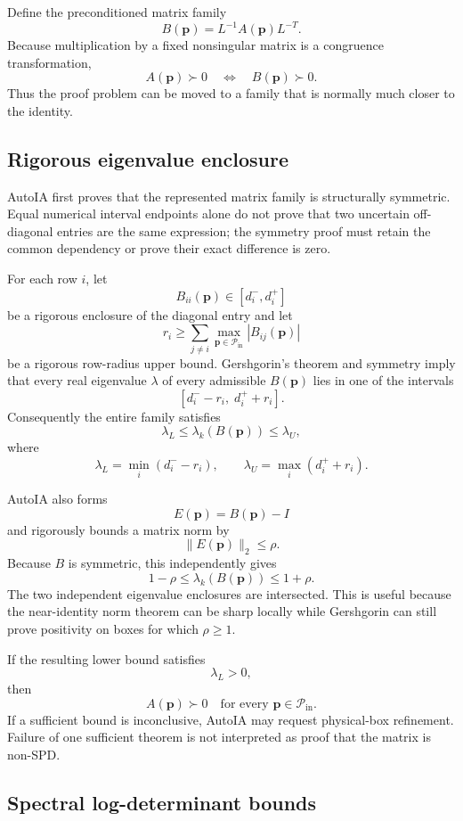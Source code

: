 \documentclass[11pt]{article}
\newcommand{\Pin}{\mathcal{P}_{\mathrm{in}}}
\newcommand{\pv}{\mathbf{p}}
\begin{document}
Define the preconditioned matrix family
\[
  B(\pv)=L^{-1}A(\pv)L^{-T}.
\]
Because multiplication by a fixed nonsingular matrix is a congruence
transformation,
\[
  A(\pv)\succ0
  \quad\Longleftrightarrow\quad
  B(\pv)\succ0.
\]
Thus the proof problem can be moved to a family that is normally much closer to
the identity.

\subsection{Rigorous eigenvalue enclosure}

AutoIA first proves that the represented matrix family is structurally
symmetric.  Equal numerical interval endpoints alone do not prove that two
uncertain off-diagonal entries are the same expression; the symmetry proof must
retain the common dependency or prove their exact difference is zero.

For each row \(i\), let
\[
  B_{ii}(\pv)\in[d_i^-,d_i^+]
\]
be a rigorous enclosure of the diagonal entry and let
\[
  r_i
  \ge
  \sum_{j\ne i}\max_{\pv\in\Pin}|B_{ij}(\pv)|
\]
be a rigorous row-radius upper bound.  Gershgorin's theorem and symmetry imply
that every real eigenvalue \(\lambda\) of every admissible \(B(\pv)\) lies in
one of the intervals
\[
  [d_i^- - r_i,\; d_i^+ + r_i].
\]
Consequently the entire family satisfies
\[
  \lambda_L
  \le \lambda_k(B(\pv))\le
  \lambda_U,
\]
where
\[
  \lambda_L=\min_i(d_i^- - r_i),
  \qquad
  \lambda_U=\max_i(d_i^+ + r_i).
\]

AutoIA also forms
\[
  E(\pv)=B(\pv)-I
\]
and rigorously bounds a matrix norm by
\[
  \|E(\pv)\|_2\le\rho.
\]
Because \(B\) is symmetric, this independently gives
\[
  1-\rho\le\lambda_k(B(\pv))\le1+\rho.
\]
The two independent eigenvalue enclosures are intersected.  This is useful
because the near-identity norm theorem can be sharp locally while Gershgorin can
still prove positivity on boxes for which \(\rho\ge1\).

If the resulting lower bound satisfies
\[
  \boxed{\lambda_L>0},
\]
then
\[
  \boxed{A(\pv)\succ0\quad\text{for every }\pv\in\Pin.}
\]
If a sufficient bound is inconclusive, AutoIA may request physical-box
refinement.  Failure of one sufficient theorem is not interpreted as proof that
the matrix is non-SPD.

\subsection{Spectral log-determinant bounds}
\end{document}
